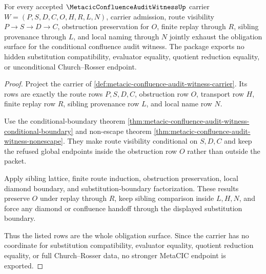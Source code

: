 \begin{theorem}
\label{thm:metacic-confluence-audit-witness-obligation-closure-package}
For every accepted $\MetacicConfluenceAuditWitnessUp$ carrier $W=(P,S,D,C,O,H,R,L,N)$, carrier admission, route visibility $P \to S \to D \to C$, obstruction preservation for $O$, finite replay through $R$, sibling provenance through $L$, and local naming through $N$ jointly exhaust the obligation surface for the conditional confluence audit witness. The package exports no hidden substitution compatibility, evaluator equality, quotient reduction equality, or unconditional Church--Rosser endpoint.
\end{theorem}
\begin{proof}
Project the carrier of \autoref{def:metacic-confluence-audit-witness-carrier}. Its rows are exactly the route rows $P,S,D,C$, obstruction row $O$, transport row $H$, finite replay row $R$, sibling provenance row $L$, and local name row $N$.

Use the conditional-boundary theorem \autoref{thm:metacic-confluence-audit-witness-conditional-boundary} and non-escape theorem \autoref{thm:metacic-confluence-audit-witness-nonescape}. They make route visibility conditional on $S,D,C$ and keep the refused global endpoints inside the obstruction row $O$ rather than outside the packet.

Apply sibling lattice, finite route induction, obstruction preservation, local diamond boundary, and substitution-boundary factorization. These results preserve $O$ under replay through $R$, keep sibling comparison inside $L,H,N$, and force any diamond or confluence handoff through the displayed substitution boundary.

Thus the listed rows are the whole obligation surface. Since the carrier has no coordinate for substitution compatibility, evaluator equality, quotient reduction equality, or full Church--Rosser data, no stronger MetaCIC endpoint is exported.
\end{proof}



